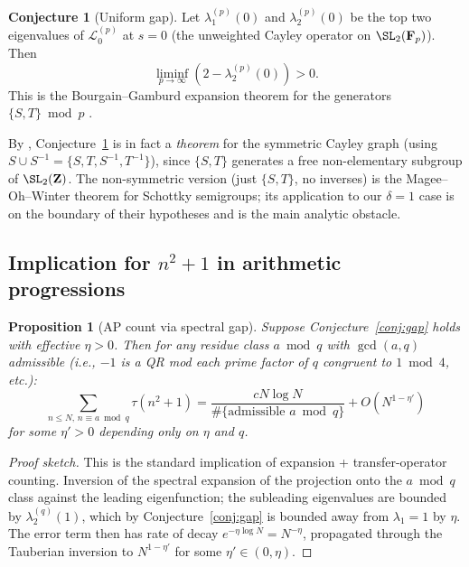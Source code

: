 ﻿\documentclass[11pt]{article}
\newtheorem{proposition}[theorem]{Proposition}
\theoremstyle{definition}
\newtheorem{conjecture}[theorem]{Conjecture}
\newcommand{\Z}{\mathbf{Z}}
\newcommand{\F}{\mathbf{F}}
\newcommand{\Lop}{\mathcal{L}}
\begin{document}
\begin{conjecture}[Uniform gap]\label{conj:uniform-gap}
Let $\lambda_1^{(p)}(0)$ and $\lambda_2^{(p)}(0)$ be the top two eigenvalues of $\Lop_0^{(p)}$ at $s=0$ (the unweighted Cayley operator on $\SL_2(\F_p)$). Then
\[
\liminf_{p\to\infty}\left(2-\lambda_2^{(p)}(0)\right) > 0.
\]
This is the Bourgain--Gamburd expansion theorem for the generators $\{S,T\}\bmod p$ \cite{bourgain-gamburd}.
\end{conjecture}

By \cite{bourgain-gamburd}, Conjecture~\ref{conj:uniform-gap} is in fact a \emph{theorem} for the symmetric Cayley graph (using $S\cup S^{-1}=\{S,T,S^{-1},T^{-1}\}$), since $\{S,T\}$ generates a free non-elementary subgroup of $\SL_2(\Z)$. The non-symmetric version (just $\{S,T\}$, no inverses) is the Magee--Oh--Winter theorem \cite{magee-oh-winter} for Schottky semigroups; its application to our $\delta=1$ case is on the boundary of their hypotheses and is the main analytic obstacle.

\subsection{Implication for $n^2+1$ in arithmetic progressions}

\begin{proposition}[AP count via spectral gap]\label{prop:ap-count}
Suppose Conjecture~\ref{conj:gap} holds with effective $\eta>0$. Then for any residue class $a\bmod q$ with $\gcd(a,q)$ admissible (i.e., $-1$ is a QR mod each prime factor of $q$ congruent to $1\bmod 4$, etc.):
\[
\sum_{n\le N,\,n\equiv a\bmod q}\tau(n^2+1) = \frac{cN\log N}{\#\{\text{admissible }a\bmod q\}} + O\!\left(N^{1-\eta'}\right)
\]
for some $\eta'>0$ depending only on $\eta$ and $q$.
\end{proposition}

\begin{proof}[Proof sketch]
This is the standard implication of expansion + transfer-operator counting. Inversion of the spectral expansion of the projection onto the $a\bmod q$ class against the leading eigenfunction; the subleading eigenvalues are bounded by $\lambda_2^{(q)}(1)$, which by Conjecture~\ref{conj:gap} is bounded away from $\lambda_1=1$ by $\eta$. The error term then has rate of decay $e^{-\eta\log N}=N^{-\eta}$, propagated through the Tauberian inversion to $N^{1-\eta'}$ for some $\eta'\in(0,\eta)$.
\end{proof}
\end{document}
